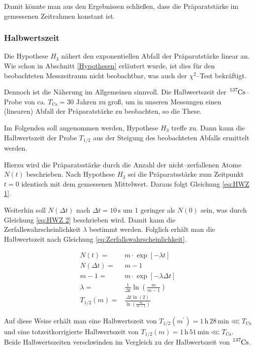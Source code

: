 \documentclass[12pt,a4paper]{scrartcl}
\numberwithin{equation}{section} %
\begin{document}
Damit könnte man aus den Ergebnissen schließen, dass die Präparatstärke im gemessenen Zeitrahmen konstant ist.

\hypertarget{totzeit}{\subsubsection{Halbwertszeit}\label{totzeit}}
Die Hypothese $H_3$ nähert den exponentiellen Abfall der Präparatstärke linear an. Wie schon in Abschnitt \ref{Hypothesen} erläutert wurde, ist dies für den beobachteten Messzeitraum nicht beobachtbar, was auch der $\chi^2$--Test bekräftigt.

Dennoch ist die Näherung im Allgemeinen sinnvoll. Die Halbwertszeit der $\ce{^{137}Cs}$--Probe von ca. $T_\mathrm{Cs}=30$ Jahren \cite{Chart of Nuclides}  zu groß, um in unseren Messungen einen (linearen) Abfall der Präparatstärke zu beobachten, so die These.

Im Folgenden soll angenommen werden, Hypothese $H_3$ treffe zu. Dann kann die Halbwertszeit der Probe $T_{1/2}$ aus der Steigung des beobachteten Abfalls ermittelt werden.

Hierzu wird die Präparatsstärke durch die Anzahl der nicht--zerfallenen Atome $N(t)$ beschrieben. Nach Hypothese $H_3$ sei die Präparatsstärke zum Zeitpunkt $t=0$ identisch mit dem gemessenen Mittelwert. Daraus folgt Gleichung \eqref{eq:HWZ 1}.

Weiterhin soll $N(\Delta t)$ nach $\Delta t=10\mathrm{\,s}$ um $1$ geringer als $N(0)$ sein, was durch Gleichung \eqref{eq:HWZ 2} beschrieben wird. Damit kann die Zerfallswahrscheinlichkeit $\lambda$ bestimmt werden. Folglich erhält man die Halbwertszeit nach Gleichung \eqref{eq:Zerfallswahrscheinlichkeit}.

\begin{align}
	N(t) =& m \cdot \exp[-\lambda t] \label{eq:HWZ 1}\\
	N(\Delta t) =& m-1 \\
	m-1 =& m \cdot \exp[-\lambda \Delta t] \label{eq:HWZ 2}\\
	\lambda =& \frac{1}{\Delta t} \ln(\frac{m}{m-1}) \\
	T_{1/2}(m) =& \frac{\Delta t \ln(2)}{\ln(\frac{m}{m-1})}
\end{align}

\noindent
Auf diese Weise erhält man eine Halbwertszeit von $T_{1/2}(m^\prime)=1\,\mathrm{h}\,28\,\mathrm{min}\lll T_\mathrm{Cs}$ und eine totzeitkorrigierte Halbwertszeit von $T_{1/2}(m)=1\,\mathrm{h}\,51\,\mathrm{min}\lll T_\mathrm{Cs}$. Beide Halbwertszeiten verschwinden im Vergleich zu der Halbwertszeit von $\ce{^{137}Cs}$.
\end{document}
